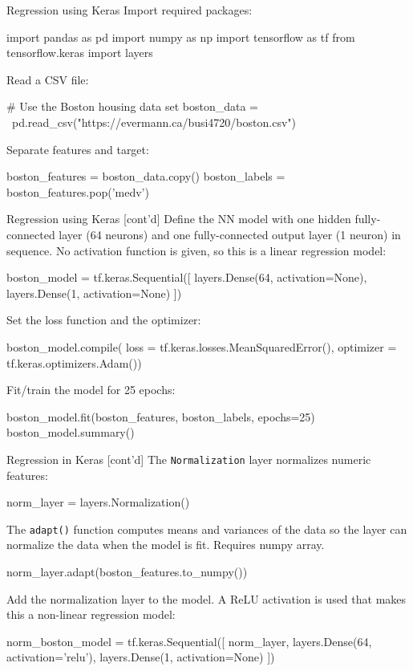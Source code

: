 \documentclass[ignorenonframetext,xcolor=x11names]{beamer}
\begin{document}
\begin{frame}[label=withcode,fragile]{Regression using Keras}
Import required packages:
\begin{pythoncode}
import pandas as pd
import numpy as np
import tensorflow as tf
from tensorflow.keras import layers
\end{pythoncode}
Read a CSV file:
\begin{pythoncode}
# Use the Boston housing data set
boston_data = \
    pd.read_csv("https://evermann.ca/busi4720/boston.csv")
\end{pythoncode}
Separate features and target:
\begin{pythoncode}
boston_features = boston_data.copy()
boston_labels = boston_features.pop('medv')
\end{pythoncode}
\end{frame}


\begin{frame}[label=withcode,fragile]{Regression using Keras \small [cont'd]}
Define the NN model with one hidden fully-connected layer (64 neurons) and one fully-connected output layer (1 neuron) in sequence. No activation function is given, so this is a linear regression model:
\begin{pythoncode}
boston_model = tf.keras.Sequential([
  layers.Dense(64, activation=None),
  layers.Dense(1, activation=None)
])
\end{pythoncode}
Set the loss function and the optimizer:
\begin{pythoncode}
boston_model.compile(
    loss = tf.keras.losses.MeanSquaredError(),
    optimizer = tf.keras.optimizers.Adam())
\end{pythoncode}
Fit/train the model for 25 epochs:
\begin{pythoncode}
boston_model.fit(boston_features, 
                 boston_labels, epochs=25)
boston_model.summary()
\end{pythoncode}
\end{frame}

\begin{frame}[label=withcode,fragile]{Regression in Keras \small [cont'd]}
The \texttt{Normalization} layer normalizes numeric features:
\begin{pythoncode}
norm_layer = layers.Normalization()
\end{pythoncode}
The \texttt{adapt()} function computes means and variances of the data so the layer can normalize the data when the model is fit. Requires numpy array.
\begin{pythoncode}
norm_layer.adapt(boston_features.to_numpy())
\end{pythoncode}
Add the normalization layer to the model. A ReLU activation is used that makes this a non-linear regression model:
\begin{pythoncode}
norm_boston_model = tf.keras.Sequential([
  norm_layer,
  layers.Dense(64, activation='relu'),
  layers.Dense(1, activation=None)
])
\end{pythoncode}
\end{frame}
\end{document}
